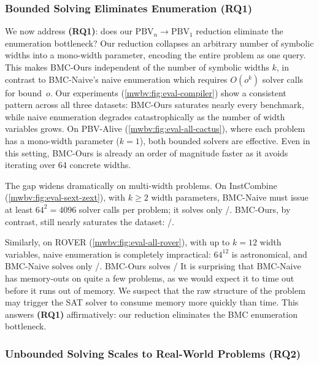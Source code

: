 \subsubsection{Bounded Solving Eliminates Enumeration \textbf{(RQ1)}}
\label{mwbv:sec:bounded-eval}

We now address \textbf{(RQ1)}: does our $\text{PBV}_n \to \text{PBV}_1$ reduction eliminate the enumeration bottleneck?
Our reduction collapses an arbitrary number of symbolic widths
into a mono-width parameter, encoding the entire problem as one \qfbv{} query.
This makes BMC-Ours independent of the number of symbolic widths $k$,
in contrast to BMC-Naive's naive enumeration which requires $O(o^k)$ solver calls
for bound~$o$.
Our experiments (\cref{mwbv:fig:eval-compiler}) show a consistent pattern across all three datasets:
%
BMC-Ours saturates nearly every benchmark, while naive enumeration degrades
catastrophically as the number of width variables grows.
On PBV-Alive (\cref{mwbv:fig:eval-all-cactus}), where each problem has a mono-width parameter ($k=1$),
both bounded solvers are effective. Even in this setting, BMC-Ours is already an order of magnitude faster
as it avoids iterating over 64 concrete widths.

The gap widens dramatically on multi-width problems.
On InstCombine (\cref{mwbv:fig:eval-sext-zext}), with $k \geq 2$ width parameters,
BMC-Naive must issue at least $64^2 = 4096$ solver calls per problem;
it solves only \SextZextInstcombineNumSolvedNbmc{}/\SextZextInstcombineNumProblemsTotal{}.
BMC-Ours, by contrast, still nearly saturates the dataset:
\SextZextInstcombineNumSolvedMbmc{}/\SextZextInstcombineNumProblemsTotal{}.

Similarly, on ROVER (\cref{mwbv:fig:eval-all-rover}), with up to $k=12$ width variables,
naive enumeration is completely impractical: $64^{12}$ is astronomical, and
BMC-Naive solves only \RoverCactusNumSolvedNbmc{}/\RoverCactusNumProblemsTotal{}.
BMC-Ours solves \RoverCactusNumSolvedMbmc{}/\RoverCactusNumProblemsTotal{}
It is surprising that BMC-Naive has memory-outs on quite a few problems,
as we would expect it to time out before it runs out of memory.
We suspect that the raw structure of the problem may trigger the SAT solver to
consume memory more quickly than time.
%
%
This answers \textbf{(RQ1)} affirmatively: our reduction eliminates the BMC enumeration bottleneck.

\subsubsection{Unbounded Solving Scales to Real-World Problems \textbf{(RQ2)}}
\label{mwbv:sec:unbounded-eval}

